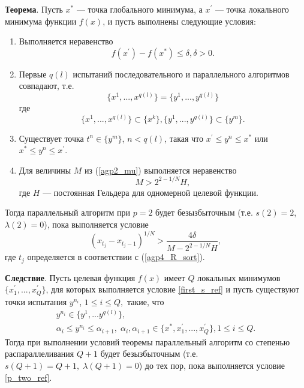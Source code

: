 \documentclass[10pt,a4paper]{book}
\begin{document}
\textbf{Теорема}. Пусть $x^*$ --- точка глобального минимума, а $x^{\prime}$ --- точка локального минимума функции $f(x)$, и пусть выполнены следующие условия:
    \begin{enumerate}
        \item Выполняется неравенство
            \begin{equation} \label{first_s_ref}
                f(x^{\prime}) - f(x^*) \leq \delta, \delta > 0.
            \end{equation}
        \item Первые $q(l)$ испытаний последовательного и параллельного алгоритмов совпадают, т.е.
            \begin{equation} \label{second_s_ref}
                \{x^1,...,x^{q(l)}\} = \{y^1,...,y^{q(l)}\}
            \end{equation}
        где
            \begin{equation} \label{third_s_ref}
                \{x^1,...,x^{q(l)}\} \subset \{x^k\}, \{y^1,...,y^{q(l)}\}\subset \{y^m\}.
            \end{equation}
        \item Существует точка $t^n \in \{y^m\}$, $n < q(l)$, такая что $x^{\prime} \leq y^n \leq x^*$ или $x^* \leq y^n \leq x^{\prime}$.
        \item Для величины $M$ из (\ref{agp2_mu}) выполняется неравенство 
            \begin{equation} \label{fourth_s_ref}
                M > 2^{2 - 1/N} H,
            \end{equation}
        где $H$ — постоянная Гельдера для одномерной целевой функции.
    \end{enumerate}
Тогда параллельный алгоритм при $p=2$ будет безызбыточным (т.е. $s(2)=2$, $\lambda(2)=0$), пока выполняется условие
\begin{equation} \label{p_two_ref}
    (x_{t_j} - x_{t_j - 1})^{1/N} > \frac{4\delta}{M - 2^{2 - 1/N} H},
\end{equation}
где $t_j$ определяется в соответствии с (\ref{agp4_R_sort}).

\textbf{Следствие}. Пусть целевая функция $f(x)$ имеет $Q$ локальных минимумов $\{x_1^{\prime},...,x_Q^{\prime}\}$, для которых выполняется условие \eqref{first_s_ref} и пусть существуют точки испытания $y^{n_i}$, $1 \leq i \leq Q,$ такие, что 
\begin{gather} 
    y^{n_i} \in \{y^1,...y^{q(l)}\}, \nonumber \\ 
    \alpha_i \leq y^{n_i} \leq \alpha_{i+1}, \; \alpha_i, \alpha_{i+1} \in \{x^*, x_1^{\prime},...,x_Q^{\prime}\}, 1 \leq i \leq Q. \nonumber
\end{gather}
Тогда при выполнении условий теоремы параллельный алгоритм со степенью распараллеливания $Q+1$ будет безызбыточным (т.е. $s(Q+1)=Q+1, \; \lambda(Q+1) =0$) до тех пор, пока выполняется условие \eqref{p_two_ref}.
\end{document}
